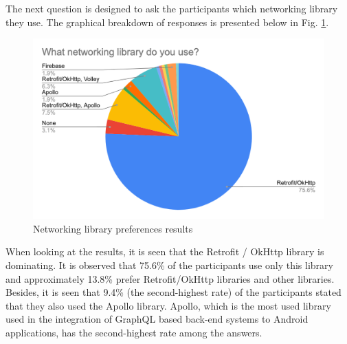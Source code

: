 The next question is designed to ask the participants which networking library they use. The graphical breakdown of responses is presented below in Fig. \ref{fig:networking_lib}. 
\begin{figure}[ht!]
    \centering
    \includegraphics[scale=0.27]{figures/survey_q7_networking_lib.png}
    \caption{Networking library preferences results}
    \label{fig:networking_lib}
\end{figure}
\FloatBarrier

When looking at the results, it is seen that the Retrofit / OkHttp library is dominating. It is observed that 75.6\% of the participants use only this library and approximately 13.8\% prefer Retrofit/OkHttp libraries and other libraries.  Besides, it is seen that 9.4\% (the second-highest rate) of the participants stated that they also used the Apollo library. Apollo, which is the most used library used in the integration of GraphQL based back-end systems to Android applications, has the second-highest rate among the answers.

